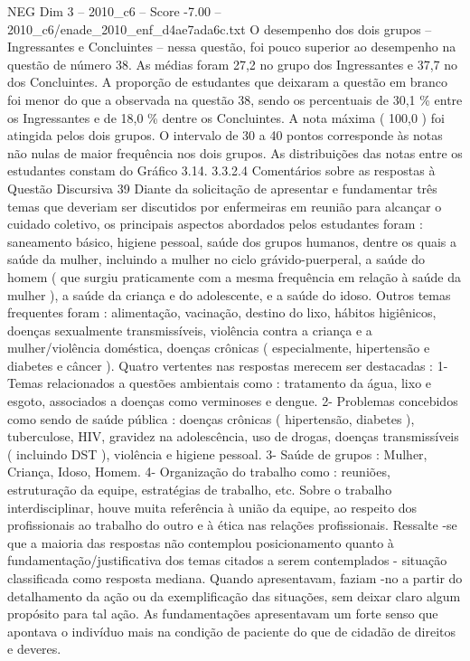 \begin{textsample}{NEG Dim 3 – 2010\_c6 – Score -7.00 – 2010\_c6/enade\_2010\_enf\_d4ae7ada6c.txt}
O desempenho dos dois grupos – Ingressantes e Concluintes – nessa questão, foi pouco superior ao desempenho na questão de número 38.
As médias foram 27,2 no grupo dos Ingressantes e 37,7 no dos Concluintes.
A proporção de estudantes que deixaram a questão em branco foi menor do que a observada na questão 38, sendo os percentuais de 30,1 \% entre os Ingressantes e de 18,0 \% dentre os Concluintes.
A nota máxima ( 100,0 ) foi atingida pelos dois grupos.
O intervalo de 30 a 40 pontos corresponde às notas não nulas de maior frequência nos dois grupos.
As distribuições das notas entre os estudantes constam do Gráfico 3.14. 3.3.2.4 Comentários sobre as respostas à Questão Discursiva 39 Diante da solicitação de apresentar e fundamentar três temas que deveriam ser discutidos por enfermeiras em reunião para alcançar o cuidado coletivo, os principais aspectos abordados pelos estudantes foram : saneamento básico, higiene pessoal, saúde dos grupos humanos, dentre os quais a saúde da mulher, incluindo a mulher no ciclo grávido-puerperal, a saúde do homem ( que surgiu praticamente com a mesma frequência em relação à saúde da mulher ), a saúde da criança e do adolescente, e a saúde do idoso.
Outros temas frequentes foram : alimentação, vacinação, destino do lixo, hábitos higiênicos, doenças sexualmente transmissíveis, violência contra a criança e a mulher/violência doméstica, doenças crônicas ( especialmente, hipertensão e diabetes e câncer ).
Quatro vertentes nas respostas merecem ser destacadas : 1- Temas relacionados a questões ambientais como : tratamento da água, lixo e esgoto, associados a doenças como verminoses e dengue. 2- Problemas concebidos como sendo de saúde pública : doenças crônicas ( hipertensão, diabetes ), tuberculose, HIV, gravidez na adolescência, uso de drogas, doenças transmissíveis ( incluindo DST ), violência e higiene pessoal. 3- Saúde de grupos : Mulher, Criança, Idoso, Homem. 4- Organização do trabalho como : reuniões, estruturação da equipe, estratégias de trabalho, etc.
Sobre o trabalho interdisciplinar, houve muita referência à união da equipe, ao respeito dos profissionais ao trabalho do outro e à ética nas relações profissionais.
Ressalte -se que a maioria das respostas não contemplou posicionamento quanto à fundamentação/justificativa dos temas citados a serem contemplados - situação classificada como resposta mediana.
Quando apresentavam, faziam -no a partir do detalhamento da ação ou da exemplificação das situações, sem deixar claro algum propósito para tal ação.
As fundamentações apresentavam um forte senso que apontava o indivíduo mais na condição de paciente do que de cidadão de direitos e deveres.

\end{textsample}
